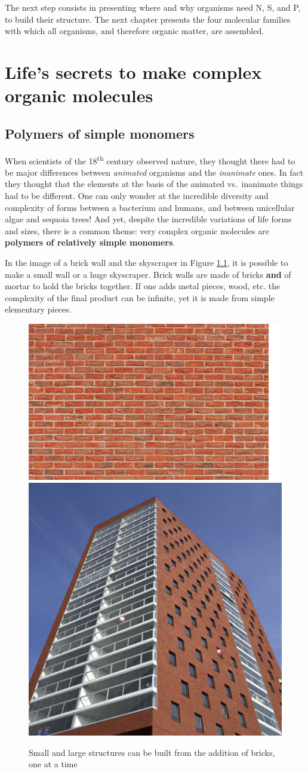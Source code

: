 \documentclass[]{book}
\theoremstyle{definition}
\theoremstyle{definition}
\theoremstyle{definition}
\theoremstyle{remark}
\begin{document}
The next step consists in presenting where and why organisms need N, S,
and P, to build their structure. The next chapter presents the four
molecular families with which all organisms, and therefore organic
matter, are assembled.

\chapter{Life's secrets to make complex organic
molecules}\label{molecular-families}

\section{Polymers of simple monomers}\label{polymers-of-simple-monomers}

When scientists of the 18\textsuperscript{th} century observed nature,
they thought there had to be major differences between \emph{animated}
organisms and the \emph{inanimate} ones. In fact they thought that the
elements at the basis of the animated vs.~inanimate things had to be
different. One can only wonder at the incredible diversity and
complexity of forms between a bacterium and humans, and between
unicellular algae and sequoia trees! And yet, despite the incredible
variations of life forms and sizes, there is a common theme: very
complex organic molecules are \textbf{polymers of relatively simple
monomers}.

In the image of a brick wall and the skyscraper in Figure
\ref{fig:brickwall}, it is possible to make a small wall or a huge
skyscraper. Brick walls are made of bricks \textbf{and} of mortar to
hold the bricks together. If one adds metal pieces, wood, etc. the
complexity of the final product can be infinite, yet it is made from
simple elementary pieces.

\begin{figure}

{\centering \includegraphics[width=0.4\linewidth]{pictures/brickwall} \includegraphics[width=0.4\linewidth]{pictures/brick-skyscraper} 

}

\caption{Small and large structures can be built from the addition of bricks, one at a time}\label{fig:brickwall}
\end{figure}
\end{document}
